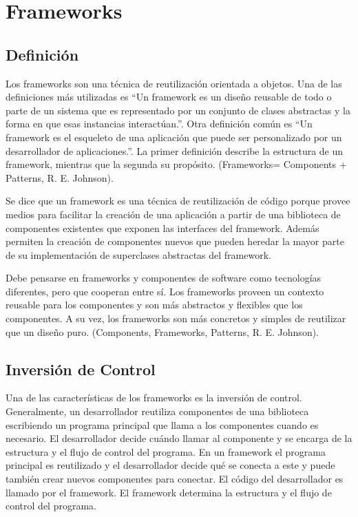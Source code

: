 
\section{Frameworks}


\subsection{Definición}


Los frameworks son una técnica de reutilización orientada a objetos.  Una de las
definiciones más utilizadas es “Un framework es un diseño reusable de todo o
parte de un sistema que es representado por un conjunto de clases abstractas y
la forma en que esas instancias interactúan.”. Otra definición común es “Un
framework es el esqueleto de una aplicación que puede ser personalizado por un
desarrollador de aplicaciones.”. La primer definición describe la estructura de
un framework, mientras que la segunda su propósito. (Frameworks= Components +
Patterns, R. E. Johnson).

Se dice que un framework es una técnica de reutilización de código porque provee
medios para facilitar la creación de una aplicación a partir de una biblioteca
de componentes existentes que exponen las interfaces del framework. Además
permiten la creación de componentes nuevos que pueden heredar la mayor parte de
su implementación de superclases abstractas del framework.


Debe pensarse en frameworks y componentes de software como tecnologías
diferentes, pero que cooperan entre sí. Los frameworks proveen un contexto
reusable para los componentes y son más abstractos y flexibles que los
componentes. A su vez, los frameworks son  más concretos y simples de reutilizar
que un diseño puro. (Components, Frameworks, Patterns, R. E. Johnson).

\subsection{Inversión de Control}
Una de las características de los frameworks es la inversión de control.
Generalmente, un desarrollador reutiliza componentes de una biblioteca 
escribiendo un programa principal que llama a los componentes cuando es 
necesario. El desarrollador decide cuándo llamar al componente y se encarga de
la estructura y el flujo de control del programa. En un framework el programa
principal es reutilizado y el desarrollador decide qué se conecta a este y
puede también crear nuevos componentes para conectar. El código del
desarrollador es llamado por el framework. El framework determina la estructura
y el flujo de control del programa.

